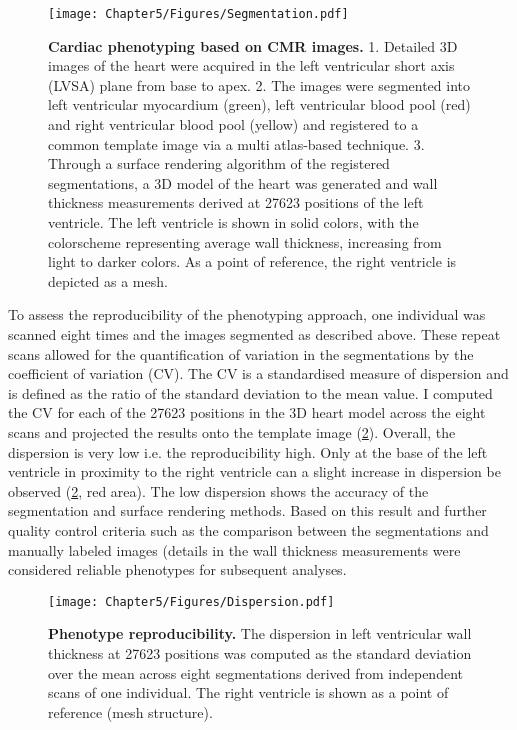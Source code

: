 \begin{figure}[h]
	\centering
	\texttt{[image: Chapter5/Figures/Segmentation.pdf]}
	\caption[\textbf{Cardiac phenotyping based on CMR images. }]{\textbf{Cardiac phenotyping based on CMR images. }1. Detailed 3D images of the heart were acquired in the left ventricular short axis (LVSA) plane from base to apex. 2. The images were segmented into left ventricular myocardium (green), left ventricular blood pool (red) and right ventricular blood pool (yellow) and registered to a common template image via a multi atlas-based technique. 3. Through a surface rendering algorithm of the registered segmentations, a 3D model of the heart was generated and wall thickness measurements derived at \num{27623} positions of the left ventricle. The left ventricle is shown in solid colors, with the colorscheme representing average wall thickness, increasing from light to darker colors. As a point of reference, the right ventricle is depicted as a mesh.}
 	\label{fig:segmentation}
\end{figure}
%
To assess the reproducibility of the phenotyping approach, one individual was scanned eight times and the images segmented as described above. These repeat scans allowed for the quantification of variation in the segmentations by the coefficient of variation (CV). The CV is a standardised measure of dispersion and is defined as the ratio of the standard deviation to the mean value. I computed the CV for each of the \num{27623} positions in the 3D heart model across the eight scans and projected the results onto the template image (\cref{fig:reproducibility}). Overall, the dispersion is very low i.e. the reproducibility high. Only at the base of the left ventricle in proximity to the right ventricle can a slight increase in dispersion be observed (\cref{fig:reproducibility}, red area). The low dispersion shows the accuracy of the segmentation and surface rendering methods. Based on this result and further quality control criteria such as the comparison between the segmentations and manually labeled images (details in \citep{deMarvao2014} the wall thickness measurements were considered reliable phenotypes for subsequent analyses. 
\\ 

\begin{figure}[h]
	\centering
	\texttt{[image: Chapter5/Figures/Dispersion.pdf]}
	\caption[\textbf{Phenotype reproducibility. }]{\textbf{Phenotype reproducibility. }The dispersion in left ventricular wall thickness at \num{27623} positions was computed as the standard deviation over the mean across eight segmentations derived from independent scans of one individual. The right ventricle is shown as a point of reference (mesh structure). }
 	\label{fig:reproducibility}
\end{figure}
%